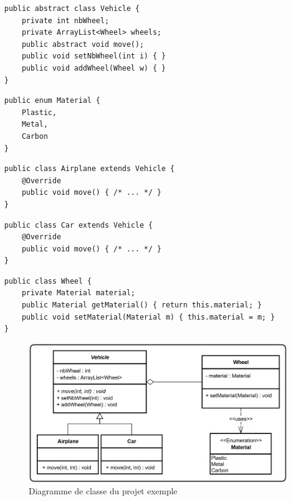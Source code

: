 \documentclass{scrartcl}
\begin{document}
\begin{minipage}{7.5cm}
\begin{lstlisting}[caption=Classe Vehicle]
public abstract class Vehicle {
    private int nbWheel;
    private ArrayList<Wheel> wheels;
    public abstract void move();
    public void setNbWheel(int i) { }
    public void addWheel(Wheel w) { }
}
\end{lstlisting}
\end{minipage}
\hspace{0.5cm}
\begin{minipage}{6cm}
\begin{lstlisting}[caption=Enumeration Material]
public enum Material {
    Plastic,
    Metal,
    Carbon
}
\end{lstlisting}
\end{minipage}
\vspace{0.5cm}
\begin{lstlisting}[caption=Classe Airplane]
public class Airplane extends Vehicle {
    @Override
    public void move() { /* ... */ }
}
\end{lstlisting}
\begin{lstlisting}[caption=Classe Car]
public class Car extends Vehicle {
    @Override
    public void move() { /* ... */ }
}
\end{lstlisting}
\begin{lstlisting}[caption=Classe Wheel]
public class Wheel {
    private Material material;
    public Material getMaterial() { return this.material; }
    public void setMaterial(Material m) { this.material = m; }
}
\end{lstlisting}



\begin{figure}
    \centering
    \includegraphics[scale=0.5]{img/uml_example.png}
    \caption{Diagramme de classe du projet exemple}
\end{figure}
\end{document}
